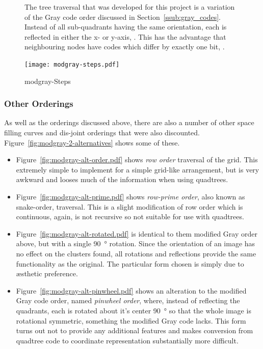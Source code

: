 \begin{figure}[tbhp]
	\caption[Modified Gray Code ordering]{The tree traversal that was developed
		for this project is a variation of the Gray code order discussed in
		Section~\ref{ssub:gray_codes}.  Instead of all sub-quadrants having the
		same orientation, each is reflected in either the x- or y-axis,
		. This has the advantage that
		neighbouring nodes have codes which differ by exactly one bit,
		.}\label{fig:modgray-traversal}
\end{figure}

\begin{figure}[tbhp]
	\centering
	\texttt{[image: modgray-steps.pdf]}
	\caption{modgray-Steps}\label{fig:modgray-steps}
\end{figure}

\subsubsection{Other Orderings}
\label{ssub:other_orderings}

As well as the orderings discussed above, there are also a number of other
space filling curves and dis-joint orderings that were also discounted.
Figure~\ref{fig:modgray-2-alternatives} shows some of these.

\begin{itemize}

	\item Figure~\ref{fig:modgray-alt-order.pdf} shows \emph{row order}
		traversal of the grid. This extremely simple to implement for a simple
		grid-like arrangement, but is very awkward and looses much of the
		information when using quadtrees.

	\item Figure~\ref{fig:modgray-alt-prime.pdf} shows \emph{row-prime order},
		also known as snake-order\cite{goodchild1983optimizing}, traversal.
		This is a slight modification of row order which is continuous, again,
		is not recursive so not suitable for use with quadtrees.

	\item Figure~\ref{fig:modgray-alt-rotated.pdf} is identical to them
		modified Gray order above, but with a single \SI{90}{\degree} rotation.
		Since the orientation of an image has no effect on the clusters found,
		all rotations and reflections provide the same functionality as the
		original. The particular form chosen is simply due to {\ae}sthetic
		preference.

	\item Figure~\ref{fig:modgray-alt-pinwheel.pdf} shows an alteration to the
		modified Gray code order, named \emph{pinwheel order}, where, instead of
		reflecting the quadrants, each is rotated about it's center
		\SI{90}{\degree} so that the whole image is rotational symmetric,
		something the modified Gray code lacks.  This form turns out not to
		provide any additional features and makes conversion from quadtree code
		to coordinate representation substantially more difficult.

\end{itemize}

